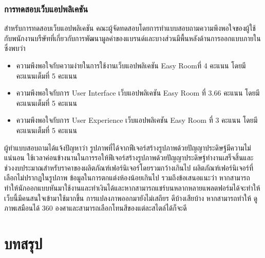 \documentclass[12pt,oneside,openright,a4paper]{cpe-thai-project}
\begin{document}
\subsection{การทดสอบเว็บแอปพลิเคชัน}
\hspace{18pt}สำหรับการทดสอบเว็บแอปพลิเคชัน คณะผู้จัดทดสอบโดยการทำแบบสอบถามความพึงพอใจของผู้ใช้ กับพนักงานบรืษัทที่เกี่ยวกับการพัฒนามูลค่าของแบรนด์และบางส่วนมีพื้นหลังด้านการออกแบบภายใน ซึ่งพบว่า
\begin{itemize}
  \item ความพึงพอใจกับความง่ายในการใช้งานเว็บแอปพลิเคชัน Easy Roomที่ 4 คะแนน โดยมีคะแนนเต็มที่ 5 คะแนน
  \item ความพึงพอใจกับการ User Interface เว็บแอปพลิเคชัน Easy Room ที่ 3.66 คะแนน โดยมีคะแนนเต็มที่ 5 คะแนน
  \item ความพึงพอใจกับการ User Experience เว็บแอปพลิเคชัน Easy Room ที่ 3 คะแนน โดยมีคะแนนเต็มที่ 5 คะแนน
\end{itemize}
\hspace{18pt}ผู้ทำแบบสอบถามได้แจ้งปัญหาว่า รูปภาพที่ได้จากฟีเจอร์สร้างรูปภาพด้วยปัญญาประดิษฐ์มีความไม่แน่นอน ใช้เวลาค่อนข้างนานในการรอให้ฟีเจอร์สร้างรูปภาพด้วยปัญญาประดิษฐ์ทำงานเสร็จสิ้นและช่วงงบประมาณสำหรับราคาของผลิตภัณฑ์เฟอร์นิเจอร์โดยรวมกว้างเกินไป ผลิตภัณฑ์เฟอร์นิเจอร์ที่เลือกไม่ปรากฎในรูปภาพ ข้อมูลในการตกแต่งห้องน้อยเกินไป
รวมถึงข้อเสนอแนะว่า หากสามารถทำให้นักออกแบบหันมาใช้งานและทำเงินได้และหากสามารถแชร์บนหลากหลายแพลตฟอร์มได้จะทำให้เว็บนี้มีคนสนใจเข้ามาใช้มากขึ้น การแปลงภาพออกมายังไม่เสถียร ดีบ้างเสียบ้าง หากสามารถทำให้ ดูภาพเสมือนได้ 360 องศาและสามารถเลือกโทนสีของแต่ละสไตล์ได้ก็จะดี

\chapter{บทสรุป}
\end{document}
